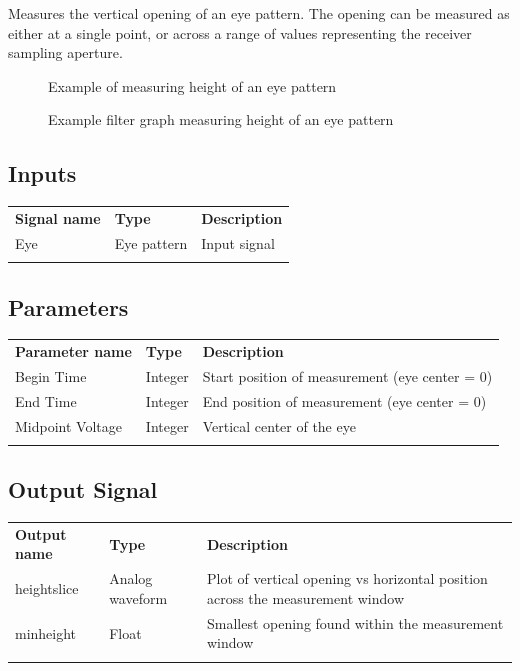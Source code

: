 Measures the vertical opening of an eye pattern. The opening can be measured as either at a single point, or across a
range of values representing the receiver sampling aperture.

\begin{figure}[h]
\centering
{}
\caption{Example of measuring height of an eye pattern}
\label{filter_eye_height}
\end{figure}

\begin{figure}[h]
\centering
{}
\caption{Example filter graph measuring height of an eye pattern}
\label{filter_graph_eye_height}
\end{figure}
\FloatBarrier

\subsection{Inputs}

\begin{tabularx}{16cm}{llX}
\thickhline
\textbf{Signal name} & \textbf{Type} & \textbf{Description} \\
\thickhline
Eye & Eye pattern & Input signal\\
\thickhline
\end{tabularx}

\subsection{Parameters}

\begin{tabularx}{16cm}{llX}
\thickhline
\textbf{Parameter name} & \textbf{Type} & \textbf{Description} \\
\thickhline
Begin Time & Integer & Start position of measurement (eye center = 0)\\
\thinhline
End Time & Integer & End position of measurement (eye center = 0)\\
\thinhline
Midpoint Voltage & Integer & Vertical center of the eye\\
\thickhline
\end{tabularx}

\subsection{Output Signal}

\begin{tabularx}{16cm}{llX}
\thickhline
\textbf{Output name} & \textbf{Type} & \textbf{Description} \\
\thickhline
heightslice & Analog waveform & Plot of vertical opening vs horizontal position across the measurement window \\
\thinhline
minheight & Float & Smallest opening found within the measurement window\\
\thickhline
\end{tabularx}

